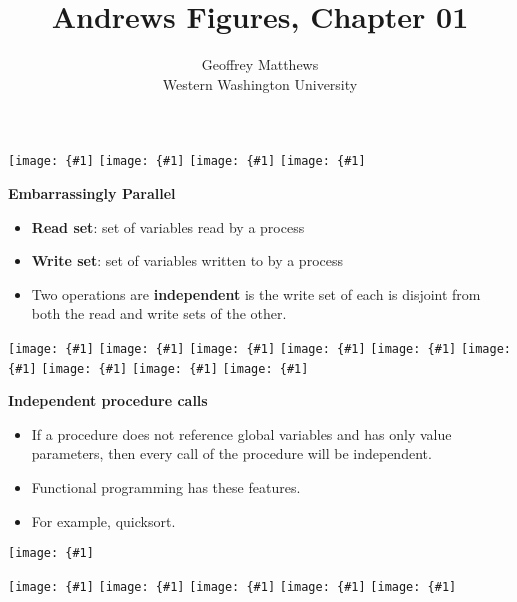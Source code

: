 \documentclass{article}
\title{Andrews Figures, Chapter 01}
\author{Geoffrey Matthews\\
\small Western Washington University}
\newcommand{\myfig}[1]{\hspace{-1.5in}\texttt{[image: \{\#1]}}\newpage}
\newcommand{\bi}{\begin{itemize}}
\newcommand{\ii}{\item}
\newcommand{\ei}{\end{itemize}}
\newcommand{\ti}[1]{\centerline{\bf #1}}
\begin{document}
\huge

\maketitle

\myfig{chap01/1_1.pdf}
\myfig{chap01/1_2.pdf}
\myfig{chap01/1_3.pdf}
\myfig{chap01/p13_mm_seq.pdf}
\ti{Embarrassingly Parallel}
\bi
\ii {\bf Read set}: set of variables read by a process
\ii {\bf Write set}: set of variables written to by a process
\ii Two operations are {\bf independent} is the write set of each is
disjoint from both the read and write sets of the other.
\ei
\newpage

\myfig{chap01/p14a_mm_rows.pdf}
\myfig{chap01/p14b_mm_cols.pdf}
\myfig{chap01/p15a_mm_rows_cols.pdf}
\myfig{chap01/p15b_mm_nested_co.pdf}
\myfig{chap01/p16a_mm_process.pdf}
\myfig{chap01/p16b_mm_strips.pdf}
\myfig{chap01/1_4.pdf}
\myfig{chap01/p18a_quad_iterative.pdf}
\myfig{chap01/p18b_quad_recursive.pdf}
\ti{Independent procedure calls}
\bi
\ii If a procedure does not reference global variables and has only
value parameters, then every call of the procedure will be
independent.
\ii Functional programming has these features.
\ii For example, quicksort.
\ei

\myfig{chap01/p18c_quad_co.pdf}

\myfig{chap01/1_5.pdf}
\myfig{chap01/1_6.pdf}
\myfig{chap01/1_7.pdf}
\myfig{chap01/p23_mm_coord_worker.pdf}
\myfig{chap01/p25_mm_circular.pdf}
\end{document}
